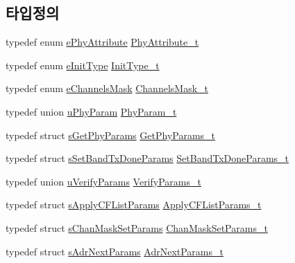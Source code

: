 \subsection*{타입정의}
\begin{DoxyCompactItemize}
\item 
typedef enum \mbox{\hyperlink{group___r_e_g_i_o_n_ga51cbe8f5433d914fe9cf81b451de2c2d}{e\+Phy\+Attribute}} \mbox{\hyperlink{group___r_e_g_i_o_n_ga9445b07fdf77581ecfaf389970e635f8}{Phy\+Attribute\+\_\+t}}
\item 
typedef enum \mbox{\hyperlink{group___r_e_g_i_o_n_ga11ecad794560a3d3961bdf1c9a27d3b2}{e\+Init\+Type}} \mbox{\hyperlink{group___r_e_g_i_o_n_gaddc73ae10673ec925724e7870363bda9}{Init\+Type\+\_\+t}}
\item 
typedef enum \mbox{\hyperlink{group___r_e_g_i_o_n_ga7a62e669f567fc160ad58210664bca9c}{e\+Channels\+Mask}} \mbox{\hyperlink{group___r_e_g_i_o_n_ga933f695eea70935418e2175940b92311}{Channels\+Mask\+\_\+t}}
\item 
typedef union \mbox{\hyperlink{unionu_phy_param}{u\+Phy\+Param}} \mbox{\hyperlink{group___r_e_g_i_o_n_gaed159b26e5c4677236b6e8677019db30}{Phy\+Param\+\_\+t}}
\item 
typedef struct \mbox{\hyperlink{structs_get_phy_params}{s\+Get\+Phy\+Params}} \mbox{\hyperlink{group___r_e_g_i_o_n_gab471483fff904f4f89bbc03f7fc380ab}{Get\+Phy\+Params\+\_\+t}}
\item 
typedef struct \mbox{\hyperlink{structs_set_band_tx_done_params}{s\+Set\+Band\+Tx\+Done\+Params}} \mbox{\hyperlink{group___r_e_g_i_o_n_gad0524aa0673c0814a71e7a4f9cade3fc}{Set\+Band\+Tx\+Done\+Params\+\_\+t}}
\item 
typedef union \mbox{\hyperlink{unionu_verify_params}{u\+Verify\+Params}} \mbox{\hyperlink{group___r_e_g_i_o_n_ga966d97bc2f25df1c09e92e60ef652276}{Verify\+Params\+\_\+t}}
\item 
typedef struct \mbox{\hyperlink{structs_apply_c_f_list_params}{s\+Apply\+C\+F\+List\+Params}} \mbox{\hyperlink{group___r_e_g_i_o_n_ga71588e9ad07e34b78fa91d51881fd3c6}{Apply\+C\+F\+List\+Params\+\_\+t}}
\item 
typedef struct \mbox{\hyperlink{structs_chan_mask_set_params}{s\+Chan\+Mask\+Set\+Params}} \mbox{\hyperlink{group___r_e_g_i_o_n_ga6d24f7da136006410827dfb29f6b9b9e}{Chan\+Mask\+Set\+Params\+\_\+t}}
\item 
typedef struct \mbox{\hyperlink{structs_adr_next_params}{s\+Adr\+Next\+Params}} \mbox{\hyperlink{group___r_e_g_i_o_n_ga567c2742622326b350b4e91bbf61b4ce}{Adr\+Next\+Params\+\_\+t}}

\end{DoxyCompactItemize}
